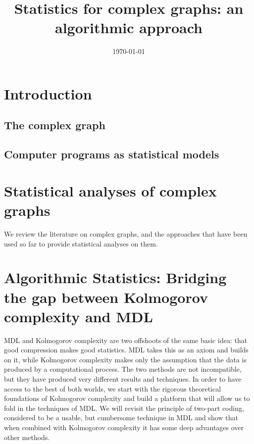 \documentclass{thesis}
\title{Statistics for complex graphs: an algorithmic approach}
\date{\today}
\begin{document}
\chapter{Introduction}


\section{The complex graph}


\section{Computer programs as statistical models}

\chapter{Statistical analyses of complex graphs}

\begin{summary}We review the literature on complex graphs, and the approaches that have been used so far to provide statistical analyses on them.
\end{summary}


\chapter{Algorithmic Statistics: Bridging the gap between Kolmogorov complexity and MDL}

\begin{summary}MDL and Kolmogorov complexity are two offshoots of the same basic idea: that good compression makes good statistics. MDL takes this as an axiom and builds on it, while Kolmogorov complexity makes only the assumption that the data is produced by a computational process. The two methods are not incompatible, but they have produced very different results and techniques. In order to have access to the best of both worlds, we start with the rigorous theoretical foundations of Kolmogorov complexity and build a platform that will allow us to fold in the techniques of MDL. We will revisit the principle of two-part coding, considered to be a usable, but cumbersome technique in MDL and show that when combined with Kolmogorov complexity it has some deep advantages over other methods.
\end{summary}
\end{document}

